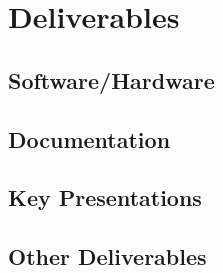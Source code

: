 \section{Deliverables}

\subsection{Software/Hardware}

\subsection{Documentation}

\subsection{Key Presentations}

\subsection{Other Deliverables}
